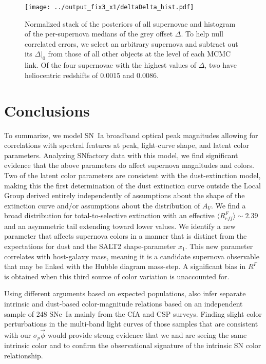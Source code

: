 \documentclass[trackchanges]{aastex61}   	%
\begin{document}
{\begin{figure}[htbp] %
   \centering
   \texttt{[image: ../output\_fix3\_x1/deltaDelta\_hist.pdf]} 
   \caption{
   Normalized stack of the posteriors of all supernovae and histogram of the per-supernova medians of the grey offset $\Delta$. 
   To help null correlated errors, we select
    an arbitrary supernova and subtract out its $\Delta|_0$ from those of all other objects at the level of each MCMC link.
  Of the four
supernovae with the highest values of $\Delta$, two have 
heliocentric
redshifts of 0.0015 and 0.0086. 
   \label{hist:fig}}
\end{figure}



\section{Conclusions}
\label{conclusions:sec}
To summarize, we model SN~Ia broadband optical peak magnitudes allowing for correlations with spectral features at peak,
light-curve shape, and
latent color parameters.  Analyzing SNfactory data with this model, we find significant evidence that the above parameters do
affect supernova magnitudes and colors.  Two of the latent color parameters are consistent with the
 dust-extinction model, making this
the first determination of the dust extinction curve outside the Local Group
derived entirely independently of assumptions about the shape of the extinction curve and/or assumptions about the
distribution of $A_V$.  
We find a broad distribution for total-to-selective extinction
with an effective
$\langle R^F_{\mathit{eff}}\rangle \sim 2.39$ and an asymmetric tail extending toward lower values.
We identify a new
parameter that affects supernova
colors in a manner that is distinct from the expectations for dust
and the SALT2 shape-parameter $x_1$.
This new parameter correlates with host-galaxy mass, meaning it is a candidate supernova observable that may be linked
with the Hubble diagram mass-step.
A significant bias in $R^F$ is obtained when this third source of color variation
is unaccounted for.

Using different arguments based on expected populations,  also infer
separate intrinsic and dust-based color-magnitude relations based on an independent sample of 248 SNe~Ia
mainly from the CfA \citep{1999AJ....117..707R, 2006AJ....131..527J, 2009ApJ...700.1097H, 2012ApJS..200...12H}
and CSP \citep{2010AJ....139..519C, 2011AJ....142..156S} surveys.
Finding slight color perturbations in the multi-band light curves 
of those samples that are  consistent with our $\sigma_p \vec{\phi}$ would provide strong evidence 
that we and    are seeing the same intrinsic color and to confirm the
observational signature of the intrinsic SN color relationship.

}
\end{document}
